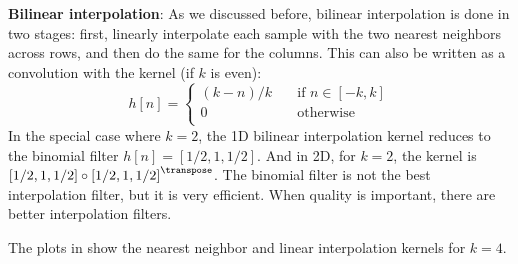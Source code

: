 {\bf Bilinear interpolation}: As we discussed before, bilinear interpolation is done in two stages: first, linearly interpolate each sample with the two nearest neighbors across rows, and then do the same for the columns. This can also be written as a convolution with the kernel (if $k$ is even):
\begin{equation}
h  \left[n\right] =  \begin{cases}
    (k-n)/k     & \quad \text{if }  n \in \left[-k, k\right] \\
    0       & \quad \text{otherwise }\\
\end{cases}
\end{equation}
In the special case where $k=2$, the 1D bilinear interpolation kernel reduces to the binomial filter $h[n] = \left[1/2,1,1/2\right]$. And in 2D, for $k=2$, the kernel is $\left[1/2,1,1/2\right] \circ \left[1/2,1,1/2\right]^\transpose$. The binomial filter is not the best interpolation filter, but it is very efficient. When quality is important, there are better interpolation filters.  

The  plots in \fig{\ref{fig:bilinear_interp_k4}} show the nearest neighbor and linear interpolation kernels for $k=4$. 

